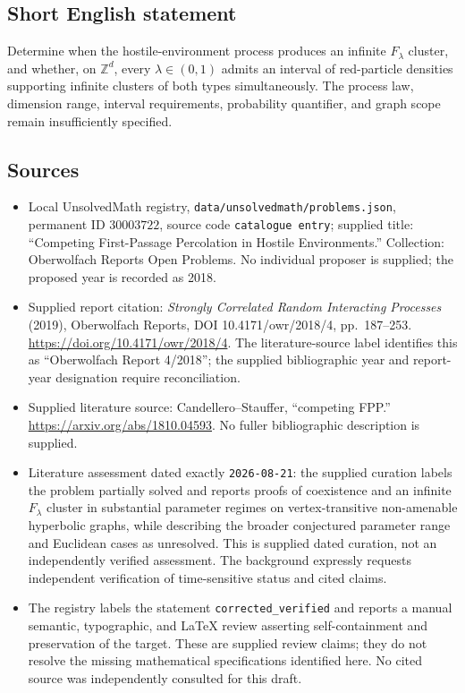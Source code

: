 \documentclass[11pt]{article}
\newcommand{\Z}{\mathbb{Z}}
\begin{document}
\subsection{Short English statement}
Determine when the hostile-environment process produces an infinite \(F_\lambda\) cluster, and whether, on \(\Z^d\), every \(\lambda\in(0,1)\) admits an interval of red-particle densities supporting infinite clusters of both types simultaneously. The process law, dimension range, interval requirements, probability quantifier, and graph scope remain insufficiently specified.
\subsection{Sources}
\begin{itemize}
\item Local UnsolvedMath registry, \texttt{data/unsolvedmath/problems.json}, permanent ID \(30003722\), source code \texttt{catalogue entry}; supplied title: ``Competing First-Passage Percolation in Hostile Environments.'' Collection: Oberwolfach Reports Open Problems. No individual proposer is supplied; the proposed year is recorded as 2018.
\item Supplied report citation: \emph{Strongly Correlated Random Interacting Processes} (2019), Oberwolfach Reports, DOI 10.4171/owr/2018/4, pp.\ 187--253. \url{https://doi.org/10.4171/owr/2018/4}. The literature-source label identifies this as ``Oberwolfach Report 4/2018''; the supplied bibliographic year and report-year designation require reconciliation.
\item Supplied literature source: Candellero--Stauffer, ``competing FPP.'' \url{https://arxiv.org/abs/1810.04593}. No fuller bibliographic description is supplied.
\item Literature assessment dated exactly \texttt{2026-08-21}: the supplied curation labels the problem partially solved and reports proofs of coexistence and an infinite \(F_\lambda\) cluster in substantial parameter regimes on vertex-transitive non-amenable hyperbolic graphs, while describing the broader conjectured parameter range and Euclidean cases as unresolved. This is supplied dated curation, not an independently verified assessment. The background expressly requests independent verification of time-sensitive status and cited claims.
\item The registry labels the statement \texttt{corrected\_verified} and reports a manual semantic, typographic, and LaTeX review asserting self-containment and preservation of the target. These are supplied review claims; they do not resolve the missing mathematical specifications identified here. No cited source was independently consulted for this draft.
\end{itemize}
\end{document}
